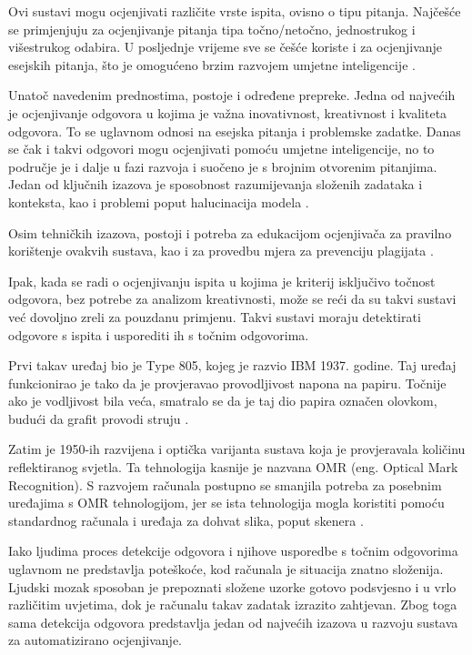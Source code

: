 \documentclass{foi}
\begin{document}
Ovi sustavi mogu ocjenjivati različite vrste ispita, ovisno o tipu pitanja. Najčešće se primjenjuju za ocjenjivanje pitanja tipa točno/netočno, jednostrukog i višestrukog odabira. U posljednje vrijeme sve se češće koriste i za ocjenjivanje esejskih pitanja, što je omogućeno brzim razvojem umjetne inteligencije \cite{Leonard2025Feb}.

Unatoč navedenim prednostima, postoje i određene prepreke. Jedna od najvećih je ocjenjivanje odgovora u kojima je važna inovativnost, kreativnost i kvaliteta odgovora. To se uglavnom odnosi na esejska pitanja i problemske zadatke. Danas se čak i takvi odgovori mogu ocjenjivati pomoću umjetne inteligencije, no to područje je i dalje u fazi razvoja i suočeno je s brojnim otvorenim pitanjima. Jedan od ključnih izazova je sposobnost razumijevanja složenih zadataka i konteksta, kao i problemi poput halucinacija modela \cite{Leonard2025Feb}.

Osim tehničkih izazova, postoji i potreba za edukacijom ocjenjivača za pravilno korištenje ovakvih sustava, kao i za provedbu mjera za prevenciju plagijata \cite{Leonard2025Feb}.

Ipak, kada se radi o ocjenjivanju ispita u kojima je kriterij isključivo točnost odgovora, bez potrebe za analizom kreativnosti, može se reći da su takvi sustavi već dovoljno zreli za pouzdanu primjenu. Takvi sustavi moraju detektirati odgovore s ispita i usporediti ih s točnim odgovorima. 

Prvi takav uređaj bio je Type 805, kojeg je razvio IBM 1937. godine. Taj uređaj funkcionirao je tako da je provjeravao provodljivost napona na papiru. Točnije ako je vodljivost bila veća, smatralo se da je taj dio papira označen olovkom, budući da grafit provodi struju \cite{OMRart}.

Zatim je 1950-ih razvijena i optička varijanta sustava koja je provjeravala količinu reflektiranog svjetla. Ta tehnologija kasnije je nazvana OMR (eng. Optical Mark Recognition). S razvojem računala postupno se smanjila potreba za posebnim uređajima s OMR tehnologijom, jer se ista tehnologija mogla koristiti pomoću standardnog računala i uređaja za dohvat slika, poput skenera \cite{OMRart}.

Iako ljudima proces detekcije odgovora i njihove usporedbe s točnim odgovorima uglavnom ne predstavlja poteškoće, kod računala je situacija znatno složenija. Ljudski mozak sposoban je prepoznati složene uzorke gotovo podsvjesno i u vrlo različitim uvjetima, dok je računalu takav zadatak izrazito zahtjevan. Zbog toga sama detekcija odgovora predstavlja jedan od najvećih izazova u razvoju sustava za automatizirano ocjenjivanje.
\end{document}
